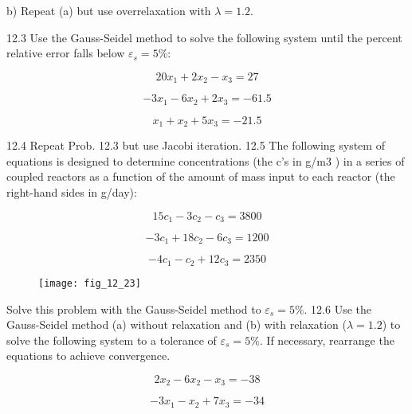 \documentclass[../main.tex]{subfiles}
\begin{document}
b) Repeat (a) but use overrelaxation with $\lambda =1.2$.

12.3 Use the Gauss-Seidel method to solve the following
system until the percent relative error falls below $\varepsilon_{s} = 5\%$:

\begin{equation}
20x_{1}+2x_{2}-x_{3}=27
\end{equation}

\begin{equation}
-3x_{1}-6x_{2}+2x_{3}=-61.5
\end{equation}

\begin{equation}
x_{1}+x_{2}+5x_{3}=-21.5
\end{equation}

12.4 Repeat Prob. 12.3 but use Jacobi iteration.
12.5 The following system of equations is designed to determine concentrations (the c's in g/m3
) in a series of coupled
reactors as a function of the amount of mass input to each
reactor (the right-hand sides in g/day):

\begin{equation}
15c_{1}-3c_{2}-c_{3}=3800
\end{equation}

\begin{equation}
-3c_{1}+18c_{2}-6c_{3}=1200
\end{equation}


\begin{equation}
-4c_{1}-c_{2}+12c_{3}=2350
\end{equation}

\begin{figure}[H]
		\centering
		\texttt{[image: fig\_12\_23]}
	   \label{fig:fig_12_23}
\end{figure}

Solve this problem with the Gauss-Seidel method to $\varepsilon _{s}=5\%$.
12.6 Use the Gauss-Seidel method (a) without relaxation
and (b) with relaxation ($\lambda =1.2$) to solve the following system to a tolerance of $\varepsilon _{s}=5\%$. If necessary, rearrange the
equations to achieve convergence.

\begin{equation}
2x_{2}-6x_{2}-x_{3}=-38
\end{equation}

\begin{equation}
-3x_{1}-x_{2}+7x_{3}=-34
\end{equation}
\end{document}
